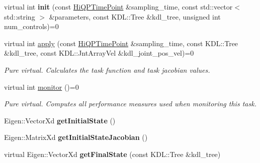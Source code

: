 \begin{DoxyCompactItemize}
\item 
\hypertarget{classhiqp_1_1TaskFunction_a74b27f9f666988edb072fb8b6a790da3}{virtual int {\bfseries init} (const \hyperlink{classhiqp_1_1HiQPTimePoint}{Hi\-Q\-P\-Time\-Point} \&sampling\-\_\-time, const std\-::vector$<$ std\-::string $>$ \&parameters, const K\-D\-L\-::\-Tree \&kdl\-\_\-tree, unsigned int num\-\_\-controls)=0}\label{classhiqp_1_1TaskFunction_a74b27f9f666988edb072fb8b6a790da3}

\item 
virtual int \hyperlink{classhiqp_1_1TaskFunction_a3c476e011c762b8a8f7470ec47f70a17}{apply} (const \hyperlink{classhiqp_1_1HiQPTimePoint}{Hi\-Q\-P\-Time\-Point} \&sampling\-\_\-time, const K\-D\-L\-::\-Tree \&kdl\-\_\-tree, const K\-D\-L\-::\-Jnt\-Array\-Vel \&kdl\-\_\-joint\-\_\-pos\-\_\-vel)=0
\begin{DoxyCompactList}\small\item\em {\itshape Pure virtual}. Calculates the task function and task jacobian values. \end{DoxyCompactList}\item 
virtual int \hyperlink{classhiqp_1_1TaskFunction_a47a3283a0c0ebafa17feeca96afe5af0}{monitor} ()=0
\begin{DoxyCompactList}\small\item\em {\itshape Pure virtual}. Computes all performance measures used when monitoring this task. \end{DoxyCompactList}\item 
\hypertarget{classhiqp_1_1TaskFunction_a43f0634f321270ff9922985bc51992c0}{Eigen\-::\-Vector\-Xd {\bfseries get\-Initial\-State} ()}\label{classhiqp_1_1TaskFunction_a43f0634f321270ff9922985bc51992c0}

\item 
\hypertarget{classhiqp_1_1TaskFunction_a1450beadd7300ae786ff8c2756c94643}{Eigen\-::\-Matrix\-Xd {\bfseries get\-Initial\-State\-Jacobian} ()}\label{classhiqp_1_1TaskFunction_a1450beadd7300ae786ff8c2756c94643}

\item 
\hypertarget{classhiqp_1_1TaskFunction_a3869d4b73495e31ef63941b9cb95e55f}{virtual Eigen\-::\-Vector\-Xd {\bfseries get\-Final\-State} (const K\-D\-L\-::\-Tree \&kdl\-\_\-tree)}\label{classhiqp_1_1TaskFunction_a3869d4b73495e31ef63941b9cb95e55f}

\end{DoxyCompactItemize}

